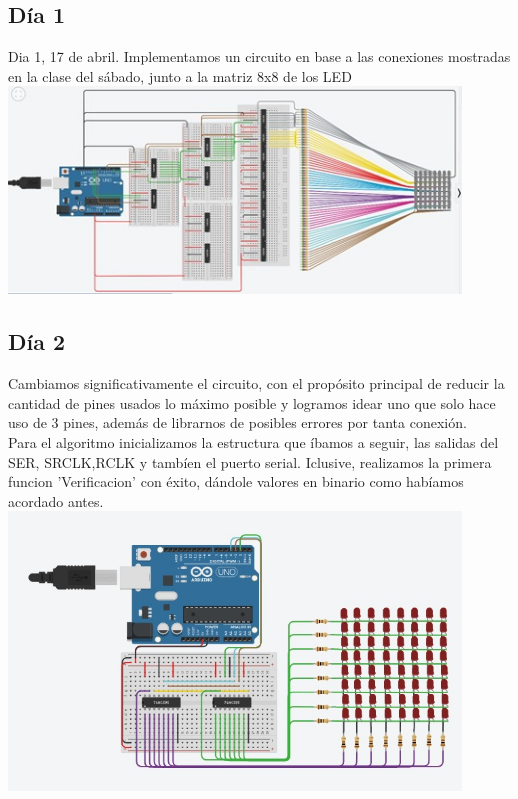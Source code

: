 \documentclass{article}
\begin{document}
\subsection{Día 1}
Dia 1, 17 de abril.
Implementamos un circuito en base a las conexiones mostradas en la clase del sábado, junto a la matriz 8x8 de los LED\\


    \includegraphics[width=12cm]{Dia 1.jpeg}



\subsection{Día 2}
Cambiamos significativamente el circuito, con el propósito principal de reducir la cantidad de pines usados lo máximo posible y logramos idear uno que solo hace uso de 3 pines, además de librarnos de posibles errores por tanta conexión.\\
Para el algoritmo inicializamos la estructura que íbamos a seguir, las salidas del SER, SRCLK,RCLK y tambíen el puerto serial. Iclusive, realizamos la primera funcion 'Verificacion' con éxito, dándole valores en binario como habíamos acordado antes.\\

\includegraphics[width=12cm]{Dia 2.jpeg}
\end{document}

